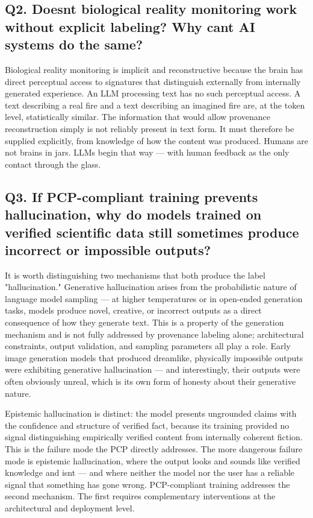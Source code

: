 \documentclass[12pt]{article}
\begin{document}
\subsection{Q2. Doesn\textquotesingle t biological reality monitoring
work without explicit labeling? Why can\textquotesingle t AI systems do
the
same?}\label{q2.-doesnt-biological-reality-monitoring-work-without-explicit-labeling-why-cant-ai-systems-do-the-same}

Biological reality monitoring is implicit and reconstructive because the
brain has direct perceptual access to signatures that distinguish
externally from internally generated experience. An LLM processing text
has no such perceptual access. A text describing a real fire and a text
describing an imagined fire are, at the token level, statistically
similar. The information that would allow provenance reconstruction
simply is not reliably present in text form. It must therefore be
supplied explicitly, from knowledge of how the content was produced.
Humans are not brains in jars. LLMs begin that way --- with human
feedback as the only contact through the glass.

\subsection{Q3. If PCP-compliant training prevents hallucination, why do
models trained on verified scientific data still sometimes produce
incorrect or impossible
outputs?}\label{q3.-if-pcp-compliant-training-prevents-hallucination-why-do-models-trained-on-verified-scientific-data-still-sometimes-produce-incorrect-or-impossible-outputs}

It is worth distinguishing two mechanisms that both produce the label
"hallucination." Generative hallucination arises from the probabilistic
nature of language model sampling --- at higher temperatures or in
open-ended generation tasks, models produce novel, creative, or
incorrect outputs as a direct consequence of how they generate text.
This is a property of the generation mechanism and is not fully
addressed by provenance labeling alone; architectural constraints,
output validation, and sampling parameters all play a role. Early image
generation models that produced dreamlike, physically impossible outputs
were exhibiting generative hallucination --- and interestingly, their
outputs were often obviously unreal, which is its own form of honesty
about their generative nature.

Epistemic hallucination is distinct: the model presents ungrounded
claims with the confidence and structure of verified fact, because its
training provided no signal distinguishing empirically verified content
from internally coherent fiction. This is the failure mode the PCP
directly addresses. The more dangerous failure mode is epistemic
hallucination, where the output looks and sounds like verified knowledge
and isn\textquotesingle t --- and where neither the model nor the user
has a reliable signal that something has gone wrong. PCP-compliant
training addresses the second mechanism. The first requires
complementary interventions at the architectural and deployment level.
\end{document}
